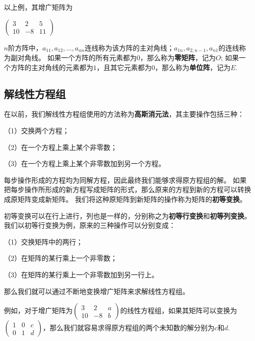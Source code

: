 \begin{example}
    以上例，其增广矩阵为

    $\begin{pmatrix}
        3 & 2 & 5 \\ 10 & -8 & 11 
    \end{pmatrix}$   
\end{example}

\begin{definition}
    $n$阶方阵中，$a_{11},a_{12},...,a_{nn}$连线称为该方阵的主对角线；$a_{1n},a_{2,n-1},a_{n1}$的连线称为副对角线。
    如果一个方阵的所有元素都为$0$，那么称为\textbf{零矩阵}，记为$O$;
    如果一个方阵的主对角线的元素都为$1$，且其它元素都为$0$，那么称为\textbf{单位阵}，记为$E$.
\end{definition}

\subsection{解线性方程组}
在以前，我们解线性方程组使用的方法称为\textbf{高斯消元法}，其主要操作包括三种：

（1）交换两个方程；

（2）在一个方程上乘上某个非零数；

（3）在一个方程上乘上某个非零数加到另一个方程。

每步操作形成的方程均为同解方程，因此最终我们能够求得原方程组的解。
如果把每步操作所形成的新方程写成矩阵的形式，那么原来的方程到新的方程可以转换成原矩阵变成新矩阵。
我们将这种原矩阵到新矩阵的操作称为矩阵的\textbf{初等变换}。

初等变换可以在行上进行，列也是一样的，分别称之为\textbf{初等行变换}和\textbf{初等列变换}。
我们以初等行变换为例，原来的三种操作可以分别变成：

（1）交换矩阵中的两行；

（2）在矩阵的某行乘上一个非零数；

（3）在矩阵的某行乘上一个非零数加到另一行上。

那么我们就可以通过不断地变换增广矩阵来求解线性方程组。

例如，对于增广矩阵为$\begin{pmatrix}
    3 & 2 & a \\ 10 & -8 & b 
\end{pmatrix}$的线性方程组，如果其矩阵可以变换为
$\begin{pmatrix}
    1 & 0 & c \\ 0 & 1 & d 
\end{pmatrix}$，那么我们就容易求得原方程组的两个未知数的解分别为$c$和$d$.

